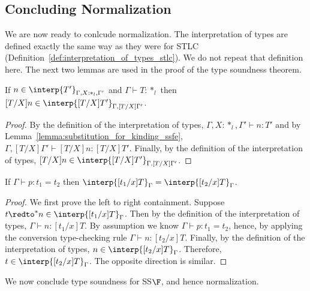 \subsection{Concluding Normalization}
\label{subsec:concluding_normalization_ssfe}
We are now ready to conlcude normalization.  The interpretation of
types are defined exactly the same way as they were for STLC
(Definition~\ref{def:interpretation_of_types_stlc}).  We do not repeat
that definition here.  The next two lemmas are used in the proof of
the type soundness theorem.

\begin{corollary}
  If $n \in \interp{T'}_{\Gamma,X:*_l,\Gamma'}$ and 
  $\Gamma \vdash T:*_l$ then 
  $[T/X]n \in \interp{[T/X]T'}_{\Gamma,[T/X]\Gamma'}$.
  \label{lemma:type_sub_ssfe}
\end{corollary}
\begin{proof}
  By the definition of the interpretation of types, $\Gamma,X:*_l,\Gamma' \vdash n:T'$ and
  by Lemma~\ref{lemma:substitution_for_kinding_ssfe}, 
  $\Gamma,[T/X]\Gamma' \vdash [T/X]n:[T/X]T'$.  Finally,
  by the definition of the interpretation of types, 
  $[T/X]n \in \interp{[T/X]T'}_{\Gamma,[T/X]\Gamma'}$.
\end{proof}
\begin{lemma}
  \label{lemma:equality_of_interpretation_of_types_ssfe}
  If $\Gamma \vdash p:t_1 = t_2$ then $\interp{[t_1/x]T}_\Gamma = \interp{[t_2/x]T}_\Gamma$.
\end{lemma}
\begin{proof}
  We first prove the left to right containment.  Suppose $t \redto^* n
  \in \interp{[t_1/x]T}_\Gamma$. Then by the definition of the
  interpretation of types, $\Gamma \vdash n:[t_1/x]T$.  By assumption
  we know $\Gamma \vdash p:t_1 = t_2$, hence, by applying the conversion
  type-checking rule $\Gamma \vdash n:[t_2/x]T$.  Finally, by the
  definition of the interpretation of types, $n \in
  \interp{[t_2/x]T}_\Gamma$.  Therefore, $t \in
  \interp{[t_2/x]T}_\Gamma$.  The opposite direction is similar.
\end{proof}
\noindent
We now conclude type soundness for SS$\F$, and hence normalization.  

